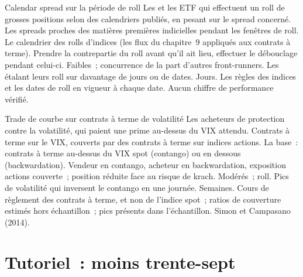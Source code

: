 \begin{strategyfile}{Calendar spread sur la période de roll}\label{strat:s1:calendar-spreads-and-curve-trades:roll}
 Les  et les ETF qui effectuent un roll de grosses positions selon des calendriers publiés, en pesant sur le spread concerné.
 Les spreads proches des matières premières indicielles pendant les fenêtres de roll.
 Le calendrier des rolls d'indices (les flux du chapitre~9 appliqués aux contrats à terme).
 Prendre la contrepartie du roll avant qu'il ait lieu, effectuer le débouclage pendant celui-ci.
 Faibles~; concurrence de la part d'autres front-runners.
 Les  étalant leurs roll sur davantage de jours ou de dates.
 Jours.
 Les règles des indices et les dates de roll en vigueur à chaque date.
 Aucun chiffre de performance vérifié.
\end{strategyfile}

\begin{strategyfile}{Trade de courbe sur contrats à terme de volatilité}\label{strat:s1:calendar-spreads-and-curve-trades:vix}
 Les acheteurs de protection contre la volatilité, qui paient une prime au-dessus du VIX attendu.
 Contrats à terme sur le VIX, couverts par des contrats à terme sur indices actions.
 La base~: contrats à terme au-dessus du VIX spot (contango) ou en dessous (backwardation).
 Vendeur en contango, acheteur en backwardation, exposition actions couverte~; position réduite face au risque de krach.
 Modérés~; roll.
 Pics de volatilité qui inversent le contango en une journée.
 Semaines.
 Cours de règlement des contrats à terme, et non de l'indice spot~; ratios de couverture estimés hors échantillon~; pics présents dans l'échantillon.
 Simon et Campasano (2014).
\end{strategyfile}

\section{Tutoriel~: moins trente-sept}\label{tut:s1:calendar-spreads-and-curve-trades:tut}

